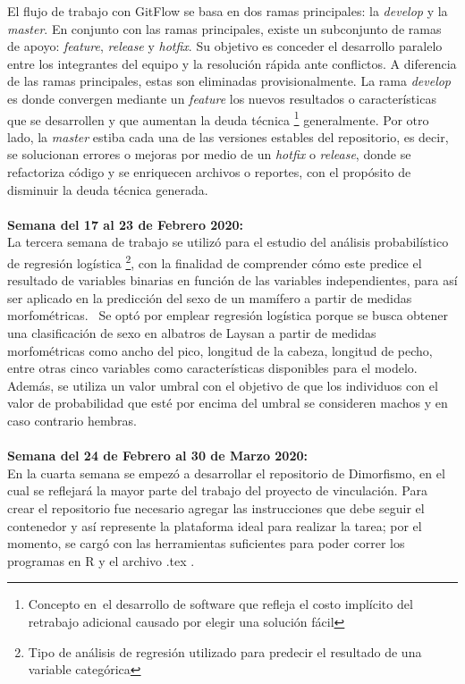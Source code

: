 \documentclass{article}
\begin{document}
     El flujo de trabajo con GitFlow se basa en dos ramas principales: la \textit{develop} y la \textit{master}. En conjunto con las ramas principales, existe un subconjunto de ramas de apoyo: \textit{feature}, \textit{release} y \textit{hotfix}. Su objetivo es conceder el desarrollo paralelo entre los integrantes del equipo y la resolución rápida ante conflictos. A diferencia de las ramas principales, estas son eliminadas provisionalmente.
    La rama \textit{develop} es donde convergen mediante un \textit{feature} los nuevos resultados o características que se desarrollen y que aumentan la deuda técnica \footnote{Concepto en el desarrollo de software que refleja el costo implícito del retrabajo adicional causado por elegir una solución fácil} generalmente. Por otro lado, la \textit{master} estiba cada una de las versiones estables del repositorio, es decir, se solucionan errores o mejoras por medio de un \textit{hotfix} o \textit{release}, donde se refactoriza código y se enriquecen archivos o reportes, con el propósito de disminuir la deuda técnica generada. 
    \\ \\ 
    \textbf{Semana del 17 al 23 de Febrero 2020:} \\
   La tercera semana de trabajo se utilizó para el estudio del análisis probabilístico de regresión logística \footnote{Tipo de análisis de regresión utilizado para predecir el resultado de una variable categórica}, con la finalidad de comprender cómo este predice el resultado de variables binarias en función de las variables independientes, para así ser aplicado en la predicción del sexo de un mamífero a partir de medidas morfométricas. 
    Se optó por emplear regresión logística porque se busca obtener una clasificación de sexo en albatros de Laysan a partir de medidas morfométricas como ancho del pico, longitud de la cabeza, longitud de pecho, entre otras cinco variables como características disponibles para el modelo. Además, se utiliza un valor umbral con el objetivo de que los individuos con el valor de probabilidad que esté por encima del umbral se consideren machos y en caso contrario hembras.
\\ \\
    \textbf{Semana del 24 de Febrero al 30 de Marzo 2020:} \\
    En la cuarta semana se empezó a desarrollar el repositorio de Dimorfismo, en el cual se reflejará la mayor parte del trabajo del proyecto de vinculación. Para crear el repositorio fue necesario agregar las instrucciones que debe seguir el contenedor y así represente la plataforma ideal para realizar la tarea; por el momento, se cargó con las herramientas suficientes para poder correr los programas en R y el archivo .tex .
\end{document}

